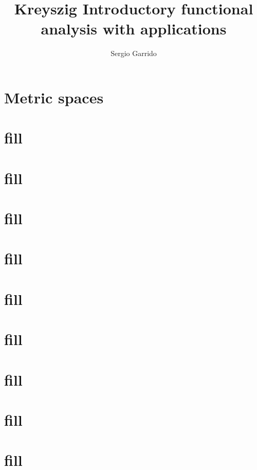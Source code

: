 \documentclass{bookSolutions}
\title{Kreyszig  Introductory functional analysis with applications}
\author{Sergio Garrido}
\begin{document}
\maketitle

\tableofcontents

\section{Metric spaces}


\section{fill}


\section{fill}

\section{fill}

\section{fill}

\section{fill}

\section{fill}

\section{fill}

\section{fill}

\section{fill}
\end{document}
